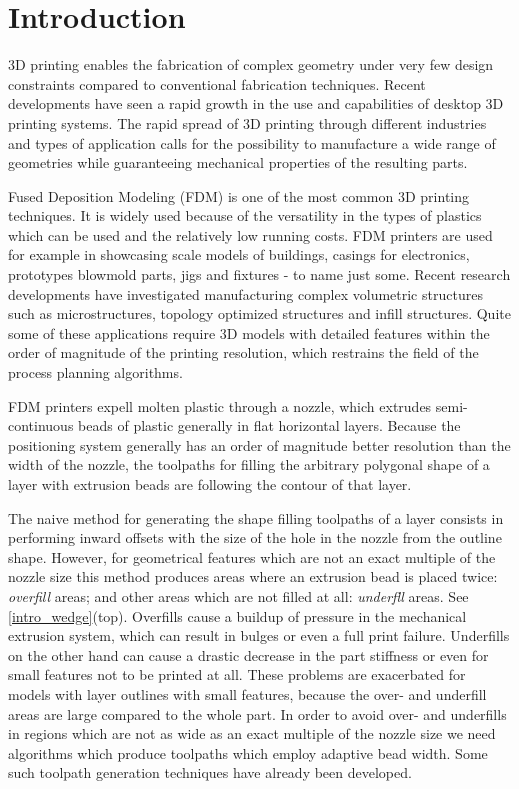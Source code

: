 \section{Introduction}
3D printing enables the fabrication of complex geometry under very few design constraints compared to conventional fabrication techniques.
Recent developments have seen a rapid growth in the use and capabilities of desktop 3D printing systems.
The rapid spread of 3D printing through different industries and types of application calls for the possibility to manufacture a wide range of geometries while guaranteeing mechanical properties of the resulting parts.

Fused Deposition Modeling (FDM) is one of the most common 3D printing techniques.
It is widely used because of the versatility in the types of plastics which can be used and the relatively low running costs.
FDM printers are used for example in showcasing scale models of buildings, casings for electronics, prototypes blowmold parts, jigs and fixtures - to name just some.
Recent research developments have investigated manufacturing complex volumetric structures such as microstructures, topology optimized structures and infill structures.
Quite some of these applications require 3D models with detailed features within the order of magnitude of the printing resolution, which restrains the field of the process planning algorithms.

FDM printers expell molten plastic through a nozzle, which extrudes semi-continuous beads of plastic generally in flat horizontal layers.
Because the positioning system generally has an order of magnitude better resolution than the width of the nozzle,
the toolpaths for filling the arbitrary polygonal shape of a layer with extrusion beads are following the contour of that layer.

The naive method for generating the shape filling toolpaths of a layer consists in performing inward offsets with the size of the hole in the nozzle from the outline shape.
However, for geometrical features which are not an exact multiple of the nozzle size this method produces areas where an extrusion bead is placed twice: \emph{overfill} areas; and other areas which are not filled at all: \emph{underfll} areas.
See \cref{intro_wedge}(top).
Overfills cause a buildup of pressure in the mechanical extrusion system, which can result in bulges or even a full print failure.
Underfills on the other hand can cause a drastic decrease in the part stiffness or even for small features not to be printed at all.
These problems are exacerbated for models with layer outlines with small features, because the over- and underfill areas are large compared to the whole part.
In order to avoid over- and underfills in regions which are not as wide as an exact multiple of the nozzle size we need algorithms which produce toolpaths which employ adaptive bead width.
Some such toolpath generation techniques have already been developed.

